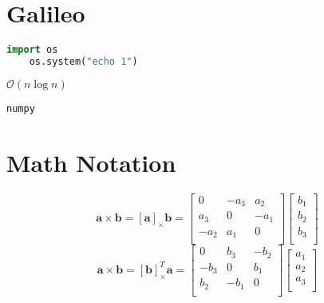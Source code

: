 \chapter{Galileo}\label{sec:appendix_galileo}

\begin{lstlisting}[language=Python]
    import os
    os.system("echo 1")
\end{lstlisting}

$\mathcal{O}\left(n\log{n}\right)$

\verb+numpy+

\chapter{Math Notation}\label{app:MathNotation}
\[
  \mathbf{a} \times  \mathbf{b}= \left[\mathbf{a}\right] _{\times} \mathbf{b}= \begin{bmatrix}
    0 & -a_3 & a_2 \\
    a_3 & 0 & -a_1 \\
    -a_2 & a_1     & 0     \\
  \end{bmatrix}
  \begin{bmatrix}
    b_1 \\
    b_2\\
    b_3\\
  \end{bmatrix}
\]
\[
  \mathbf{a} \times  \mathbf{b}= \left[\mathbf{b}\right]_{\times}^{T} \mathbf{a}= \begin{bmatrix}
    0 & b_3 & -b_2 \\
    -b_3 & 0 & b_1 \\
    b_2 & -b_1     & 0     \\
  \end{bmatrix}
  \begin{bmatrix}
    a_1 \\
    a_2\\
    a_3\\
  \end{bmatrix}
\]
